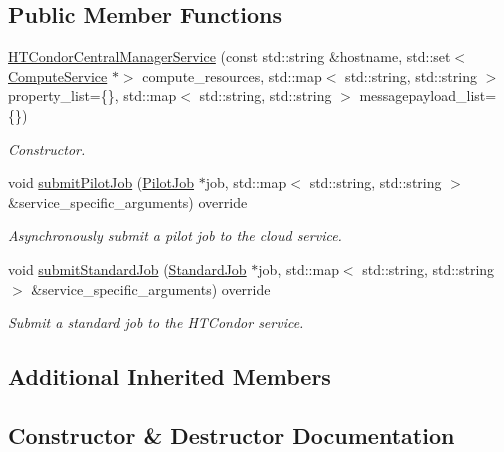 \subsection*{Public Member Functions}
\begin{DoxyCompactItemize}
\item 
\hyperlink{classwrench_1_1_h_t_condor_central_manager_service_acc295c6ed3ed9d036d72a41150f4a05a}{H\+T\+Condor\+Central\+Manager\+Service} (const std\+::string \&hostname, std\+::set$<$ \hyperlink{classwrench_1_1_compute_service}{Compute\+Service} $\ast$$>$ compute\+\_\+resources, std\+::map$<$ std\+::string, std\+::string $>$ property\+\_\+list=\{\}, std\+::map$<$ std\+::string, std\+::string $>$ messagepayload\+\_\+list=\{\})
\begin{DoxyCompactList}\small\item\em Constructor. \end{DoxyCompactList}\item 
void \hyperlink{classwrench_1_1_h_t_condor_central_manager_service_aa2fb9163f33416d64fe3ab16ac83361e}{submit\+Pilot\+Job} (\hyperlink{classwrench_1_1_pilot_job}{Pilot\+Job} $\ast$job, std\+::map$<$ std\+::string, std\+::string $>$ \&service\+\_\+specific\+\_\+arguments) override
\begin{DoxyCompactList}\small\item\em Asynchronously submit a pilot job to the cloud service. \end{DoxyCompactList}\item 
void \hyperlink{classwrench_1_1_h_t_condor_central_manager_service_a13c687548742cb39b6529e63a9b7e6a4}{submit\+Standard\+Job} (\hyperlink{classwrench_1_1_standard_job}{Standard\+Job} $\ast$job, std\+::map$<$ std\+::string, std\+::string $>$ \&service\+\_\+specific\+\_\+arguments) override
\begin{DoxyCompactList}\small\item\em Submit a standard job to the H\+T\+Condor service. \end{DoxyCompactList}\end{DoxyCompactItemize}
\subsection*{Additional Inherited Members}


\subsection{Constructor \& Destructor Documentation}
\mbox{\label{classwrench_1_1_h_t_condor_central_manager_service_acc295c6ed3ed9d036d72a41150f4a05a}} 
